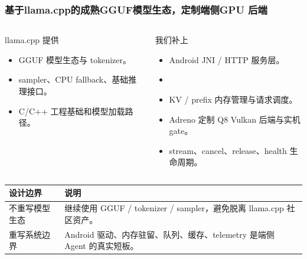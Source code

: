 \begin{frame}
  \frametitle{基于llama.cpp的成熟GGUF模型生态，定制端侧GPU 后端}
  \begin{columns}[T,onlytextwidth]
    \begin{column}{0.48\textwidth}
      \begin{block}{llama.cpp 提供}
        \scriptsize
        \begin{itemize}
          \item GGUF 模型生态与 tokenizer。
          \item sampler、CPU fallback、基础推理接口。
          \item C/C++ 工程基础和模型加载路径。
        \end{itemize}
      \end{block}
    \end{column}
    \begin{column}{0.48\textwidth}
      \begin{block}{我们补上}
        \scriptsize
        \begin{itemize}
          \item Android JNI / HTTP 服务层。
          \item \item KV / prefix 内存管理与请求调度。
          \item Adreno 定制 Q8 Vulkan 后端与实机 gate。
          \item stream、cancel、release、health 生命周期。
          
        \end{itemize}
      \end{block}
    \end{column}
  \end{columns}

  \vspace{0.55em}
  \scriptsize
  \begin{tabularx}{\textwidth}{p{}Y}
    \toprule
    设计边界 & 说明 \\
    \midrule
    不重写模型生态 & 继续使用 GGUF / tokenizer / sampler，避免脱离 llama.cpp 社区资产。 \\
    重写系统边界 & Android 驱动、内存驻留、队列、缓存、telemetry 是端侧 Agent 的真实短板。 \\
    \bottomrule
  \end{tabularx}
\end{frame}

